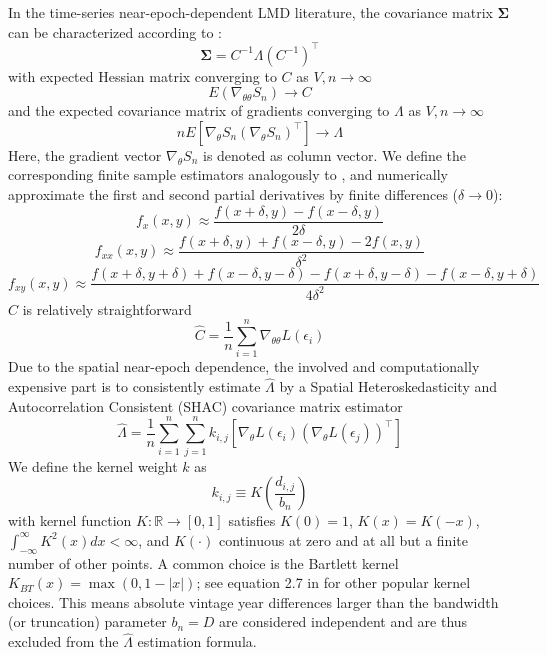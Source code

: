 \documentclass[12pt]{article}
\begin{document}
In the time-series near-epoch-dependent LMD literature, the covariance matrix $\mathbf{\Sigma}$ can be characterized according to \citet[Theorem 11.2.b, Theorem H.1]{PP97}:
\[
\mathbf{\Sigma} = C^{-1} \Lambda (C^{-1})^\top
\]
with expected Hessian matrix converging to $C$ as $V,n \to \infty$
\[
E 
\left(
\nabla_{\theta \theta} S_n
\right)
\to C
\]
and the expected covariance matrix of gradients converging to $\Lambda$ as $V,n \to \infty$
\[
n E 
\left[
\nabla_{\theta} S_n
(\nabla_{\theta} S_n)^\top
\right]
\to \Lambda
\]
Here, the gradient vector $\nabla_{\theta} S_n$ is denoted as column vector.
We define the corresponding finite sample estimators analogously to \citet[Chapters 12, 13.1]{PP97}, and numerically approximate the first and second partial derivatives by finite differences ($\delta \to 0$): 
\[
f_{x}(x,y) \approx \frac{f(x+\delta,y) - f(x-\delta,y)}{2\delta}
\]
\[
f_{xx}(x,y) \approx \frac{f(x+\delta,y) + f(x-\delta,y) - 2  f(x,y)}{\delta^2}
\]
\[
f_{xy}(x,y) \approx \frac{f(x+\delta,y+\delta) + f(x-\delta,y-\delta) -  f(x+\delta,y-\delta) - f(x-\delta,y+\delta)}{4\delta^2}
\]
$\hat{C}$ is relatively straightforward
\[
\hat{C} = \frac{1}{n} \sum_{i=1}^n \nabla_{\theta \theta} L \left( \epsilon_i \right)
\]
Due to the spatial near-epoch dependence, the involved and computationally expensive part is to consistently estimate $\hat{\Lambda}$ by a Spatial Heteroskedasticity and Autocorrelation Consistent (SHAC) covariance matrix estimator \cite[equation 2]{KS11}
\begin{equation}
\label{eq:hac}
\hat{\Lambda} = \frac{1}{n} \sum_{i=1}^n \sum_{j=1}^n
k_{i,j}
\left[
\nabla_{\theta} L \left( \epsilon_i \right)
\left(
\nabla_{\theta} L \left( \epsilon_j \right)
\right)^\top
\right]
\end{equation}
We define the kernel weight $k$ as
\[
k_{i,j} \equiv K \left( \frac{d_{i,j}}{b_n} \right)
\]
with kernel function $K: \mathbb{R} \to [0,1]$ satisfies $K(0)=1$, $K(x)=K(-x)$, $\int_{-\infty}^{\infty} K^2(x) dx < \infty$, and $K(\cdot)$ continuous at zero and at all but a finite number of other points.
A common choice is the Bartlett kernel $K_{BT}(x)= \max(0, 1-|x|)$; see equation 2.7 in \cite{A91} for other popular kernel choices.
This means absolute vintage year differences larger than the bandwidth (or truncation) parameter $b_n=D$ are considered independent and are thus excluded from the $\hat{\Lambda}$ estimation formula.
\end{document}
